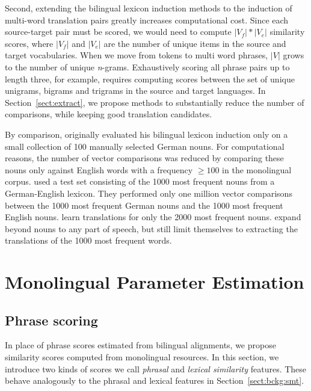 \documentclass[11pt]{article}
\newcommand{\secref}[1]{Section~\ref{#1}}
\begin{document}
Second, extending the bilingual lexicon induction methods to the induction of multi-word translation pairs greatly increases computational cost. Since each source-target pair must be scored, we would need to compute $|V_{f}| * |V_{e}|$ similarity scores, where $|V_{f}|$ and $|V_{e}|$ are the number of unique items in the source and target vocabularies. When we move from tokens to multi word phrases, $|V|$ grows to the number of unique {\it n}-grams. Exhaustively scoring all phrase pairs up to length three, for example, requires computing scores between the set of unique unigrams, bigrams and trigrams in the source and target languages.  In \secref{sect:extract}, we propose methods to substantially reduce the number of comparisons, while keeping good translation candidates.

By comparison,  originally evaluated his bilingual lexicon induction only on a small collection of 100 manually selected German nouns.  For computational reasons, the number of vector comparisons was reduced by comparing these nouns only against English words with a frequency $\geq100$ in the monolingual corpus.
 used a test set consisting of the 1000 most frequent nouns from a German-English lexicon.  They performed only one million vector comparisons between the 1000 most frequent German nouns and the 1000 most frequent English nouns.
 learn translations for only the 2000 most frequent nouns.    expand beyond nouns to any part of speech, but still limit themselves to extracting the translations of the 1000 most frequent words.


\section{Monolingual Parameter Estimation} \label{sect:mono}

\subsection{Phrase scoring} \label{sect:score}

In place of phrase scores estimated from bilingual alignments, we propose similarity scores computed  from monolingual resources.  In this section, we introduce two kinds of scores we call {\em phrasal} and {\em lexical similarity} features.  
These behave analogously to the phrasal and lexical features in \secref{sect:bckg:smt}.
\end{document}

